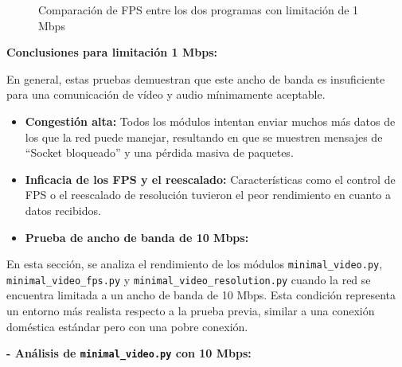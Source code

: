 \begin{figure}[H]
\centering
{}
\caption{Comparación de FPS entre los dos programas con limitación de 1 Mbps}
\label{fig:comparacionfps_1mb}
\end{figure}

\textbf{Conclusiones para limitación 1 Mbps:}

En general, estas pruebas demuestran que este ancho de banda es insuficiente para una comunicación de vídeo y audio mínimamente aceptable.
\begin{itemize}
    \item \textbf{Congestión alta:} Todos los módulos intentan enviar muchos más datos de los que la red puede manejar, resultando en que se muestren mensajes de ``Socket bloqueado'' y una pérdida masiva de paquetes.
    \item \textbf{Inficacia de los FPS y el reescalado:} Características como el control de FPS o el reescalado de resolución tuvieron el peor rendimiento en cuanto a datos recibidos.
\end{itemize}

\newpage

\begin{itemize}
  \item \textbf{Prueba de ancho de banda de 10 Mbps:}
\end{itemize}

En esta sección, se analiza el rendimiento de los módulos \texttt{minimal\_video.py}, \texttt{minimal\_video\_fps.py} y \texttt{minimal\_video\_resolution.py} cuando la red se encuentra limitada a un ancho de banda de 10 Mbps. Esta condición representa un entorno más realista respecto a la prueba previa, similar a una conexión doméstica estándar pero con una pobre conexión.
\vspace{\baselineskip}

\textbf{- Análisis de \texttt{minimal\_video.py} con 10 Mbps:}
\vspace{\baselineskip}

